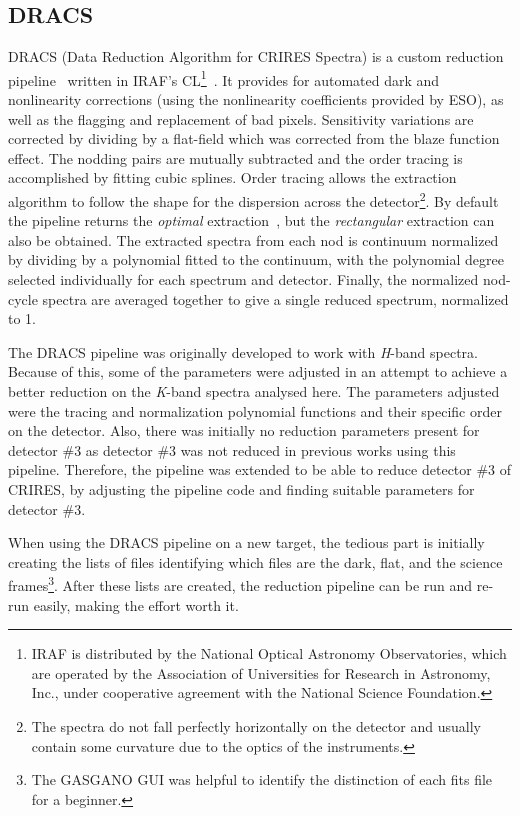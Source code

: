 \subsection{{DRACS}}
\label{subsec:dracs}
{DRACS} (Data Reduction Algorithm for {CRIRES} Spectra) is a custom reduction pipeline~\citep{figueira_radial_2010} written in {IRAF}'s CL\footnote{{IRAF} is distributed by the National Optical Astronomy Observatories, which are operated by the Association of Universities for Research in Astronomy, {Inc.}, under cooperative agreement with the National Science Foundation.}~\citep{tody_iraf_1993}.
It provides for automated dark and nonlinearity corrections (using the nonlinearity coefficients provided by {ESO}), as well as the flagging and replacement of bad pixels.
Sensitivity variations are corrected by dividing by a flat-field which was corrected from the blaze function effect.
The nodding pairs are mutually subtracted and the order tracing is accomplished by fitting cubic splines.
Order tracing allows the extraction algorithm to follow the shape for the dispersion across the detector\footnote{The spectra do not fall perfectly horizontally on the detector and usually contain some curvature due to the optics of the instruments.}.
By default the pipeline returns the \emph{optimal} extraction~\citep{horne_optimal_1986}, but the \emph{rectangular} extraction can also be obtained.
The extracted spectra from each nod is continuum normalized by dividing by a polynomial fitted to the continuum, with the polynomial degree selected individually for each spectrum and detector.
Finally, the normalized nod-cycle spectra are averaged together to give a single reduced spectrum, normalized to 1.

The {DRACS} pipeline was originally developed to work with \emph{H}-band spectra.
Because of this, some of the parameters were adjusted in an attempt to achieve a better reduction on the \emph{K}-band spectra analysed here.
The parameters adjusted were the tracing and normalization polynomial functions and their specific order on the detector.
Also, there was initially no reduction parameters present for detector \#3 as detector \#3 was not reduced in previous works using this pipeline.
Therefore, the pipeline was extended to be able to reduce detector \#3 of CRIRES, by adjusting the pipeline code and finding suitable parameters for detector \#3.

When using the {DRACS} pipeline on a new target, the tedious part is initially creating the lists of files identifying which files are the dark, flat, and the science frames\footnote{The {GASGANO} {GUI} was helpful to identify the distinction of each fits file for a beginner.}.
After these lists are created, the reduction pipeline can be run and re-run easily, making the effort worth it.

